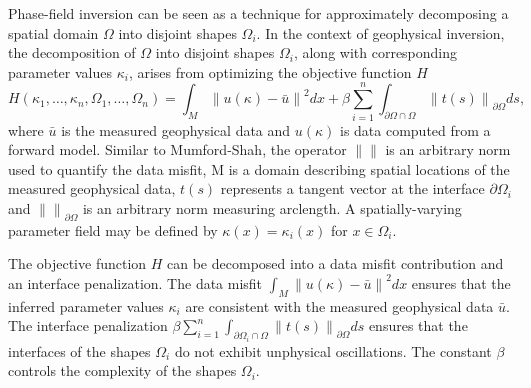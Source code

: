 \documentclass[manuscript,revised]{geophysics}
\newcommand\norm[1]{\left\lVert#1\right\rVert}
\begin{document}
Phase-field inversion can be seen as a technique for approximately decomposing a spatial domain $\Omega$ into disjoint shapes $\Omega_i$.  In the context of geophysical inversion, the decomposition of $\Omega$ into disjoint shapes $\Omega_i$, along with corresponding parameter values $\kappa_i$, arises from optimizing the objective function $H$
\begin{equation} \label{eq:pf}
H \left( \kappa_1,…,\kappa_n, \Omega_1,…,\Omega_n \right) = \int_M \norm{u(\kappa)-\bar{u}}^2 dx+ \beta \sum_{i=1}^n \int_{\partial\Omega \cap \Omega} \norm{t(s)}_{\partial\Omega} ds ,
\end{equation}
where $\bar{u}$ is the measured geophysical data and $u(\kappa)$ is data computed from a forward model.  Similar to Mumford-Shah, the operator $\norm{}$ is an arbitrary norm used to quantify the data misfit, M is a domain describing spatial locations of the measured geophysical data, $t(s)$ represents a tangent vector at the interface $\partial\Omega_i$ and $\norm{}_{\partial\Omega}$  is an arbitrary norm measuring arclength. A spatially-varying parameter field may be defined by $\kappa(x)=\kappa_i (x)$ for $x \in \Omega_i$.  

The objective function $H$ can be decomposed into a data misfit contribution and an interface penalization. The data misfit $\int_M \norm{u(\kappa)-\bar{u}}^2  dx$
ensures that the inferred parameter values $\kappa_i$ are consistent with the measured geophysical data $\bar{u}$. The interface penalization 
$\beta \sum_{i=1}^n \int_{\partial\Omega_i \cap \Omega} \norm{t(s)}_{\partial\Omega}  ds$
ensures that the interfaces of the shapes $\Omega_i$ do not exhibit unphysical oscillations. The constant $\beta$ controls the complexity of the shapes $\Omega_i$.
\begin{comment}
There are two methods that are commonly used to optimize the objective function $H$ -- the phase-field approximation and the level-set method.  The phase-field technique has traditionally been used in materials science and physics to describe phase transitions and other interfacial phenomena (\cite{Chen_2002}).  The phase-field method~\cite{Deckelnick_2005} represents and moves shapes using a function which is equal, approximately, to one inside of the shape and equal, approximately, to negative one outside of the shape.  In addition, there is a narrow transition layer where the function transitions between the values of one and negative one.  Because the phase field technique does not explicitly identify the boundary of the shape, it is known as a diffuse interface method.   
\end{comment}
\end{document}
